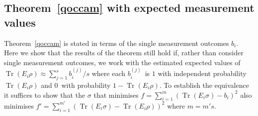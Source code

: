 \documentclass[aps,superscriptaddress,nofootinbib,twocolumn]{revtex4-1}
\begin{document}
\begin{widetext}
\section{Theorem~\ref{qoccam} with expected measurement values}

Theorem~\ref{qoccam} is stated in terms of the single measurement outcomes $b_i$. Here we show that the results of the theorem still hold if, rather than consider single measurement outcomes, we work with the estimated expected values of $ \operatorname*{Tr}\left(E_i \rho \right) \approx \sum_{j=1} ^s b_i ^{(j)}  / s$ where each $b_{i} ^{(j)}$\ is $1$ with independent probability $\operatorname*{Tr}\left(  E_{i}\rho\right)  $ and $0$\ with probability $1-\operatorname*{Tr}\left(  E_{i}\rho\right)  $. To establish the equivalence it suffices to show that the $\sigma$ that minimises $f  = \sum_{i=1}^m (  \operatorname*{Tr}(  E_{i}\sigma) -b_i)^2$ also minimises $f' = \sum_{i=1}^{m'}\left(  \operatorname*{Tr}\left(  E_{i}\sigma\right) - \operatorname*{Tr}\left(E_i \rho \right) \right)  ^{2}$ where $m=m's$. 


\end{widetext}
\end{document}
